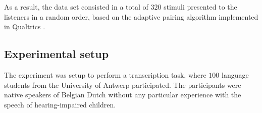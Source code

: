 As a result, the data set consisted in a total of $320$ stimuli presented to the listeners in a random order, based on the \textcolor{}{adaptive pairing algorithm} \citep{Pollitt_2012b} implemented in Qualtrics \citet{Qualtrics_2005}.
%
\begin{comment}
under the Design of Experiments (DoE) literature, we would say we have $32$ experimental units with $10$ replicate runs each, making a total of $320$ experimental runs. As it is defined in \citet{Lawson_2015}, an experimental unit is the item under study upon which something is changed, while a replicate run is the experiment conducted with the same factor settings, but using different experimental units. 
\end{comment}
%
\begin{comment}
evidence suggest that the number of comparisons and pairing algorithm impacts the reliability, validity and efficiency of the procedure \citep{Bramley_2015, Bramley_et_al_2018, Lesterhuis_2018, Verhavert_et_al_2019}. However, this is not investigated in the current research.
\end{comment}
%
\begin{comment}
Similar designs were used by \citet{Boonen_et_al_2020} and \citet{Faes_et_al_2021}. However, in the former case the number of samples were low, while in the latter, the design was unbalanced and not conducive to appropriate inferences from the pairwise comparisons.
\end{comment}
%
\begin{comment}
	\textbf{for the experimenter:} Based on \citet{Faes_et_al_2021} we depict the procedure for the experimenter:
	\begin{enumerate}
		\item 1. matching procedure 
		\item selection of suitable stimuli
		\item determine the number of stimuli per judge 
	\end{enumerate}	
\end{comment}
%
%
\subsection{Experimental setup}
%
The experiment was setup to perform a transcription task, where $100$ language students from the University of Antwerp participated. The participants were native speakers of Belgian Dutch without any particular experience with the speech of hearing-impaired children.

